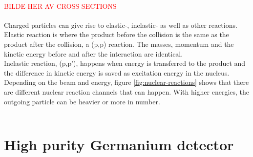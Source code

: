 \documentclass[twoside,english]{uiofysmaster/uiofysmaster}
\begin{document}
\\
\textcolor{red}{BILDE HER AV CROSS SECTIONS}
\\
\\
Charged particles can give rise to elastic-, inelastic- as well as other reactions. Elastic reaction is where the product before the collision is the same as the product after the collision, a (p,p) reaction. The masses, momentum and the kinetic energy before and after the interaction are identical\cite{Nuclear_medicine}.\\
Inelastic reaction, (p,p'), happens when energy is transferred to the product and the difference in kinetic energy is saved as excitation energy in the nucleus.
\noindent
Depending on the beam and energy, figure \ref{fig:nuclear-reactions} shows that there are different nuclear reaction channels that can happen. With higher energies, the outgoing particle can be heavier or more in number. 
\\
\\
\section{High purity Germanium detector}
\label{sec:ge-detector}
\end{document}
